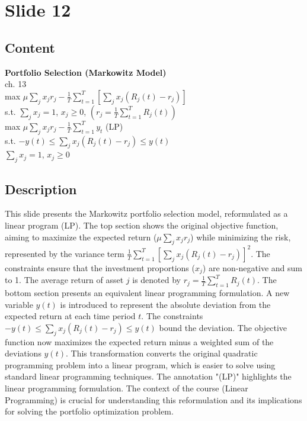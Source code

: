 \documentclass{article}%
\begin{document}
%
\newpage%
\section{Slide 12}%
\label{sec:Slide12}%
\subsection{Content}%

\textbf{Portfolio Selection (Markowitz Model)} \\
[v]ch. 13 \\
max $\mu \sum_j x_j r_j - \frac{1}{T} \sum_{t=1}^T \left[ \sum_j x_j (R_j(t) - r_j) \right]$ \\
s.t. $\sum_j x_j = 1$, $x_j \ge 0$, $\left( r_j = \frac{1}{T} \sum_{t=1}^T R_j(t) \right)$ \\
max $\mu \sum_j x_j r_j - \frac{1}{T} \sum_{t=1}^T y_t$ (LP) \\
s.t. $-y(t) \le \sum_j x_j (R_j(t) - r_j) \le y(t)$ \\
$\sum_j x_j = 1$, $x_j \ge 0$
%
\subsection{Description}%
This slide presents the Markowitz portfolio selection model, reformulated as a linear program (LP).  The top section shows the original objective function, aiming to maximize the expected return ($\mu \sum_j x_j r_j$) while minimizing the risk, represented by the variance term $\frac{1}{T} \sum_{t=1}^T [\sum_j x_j (R_j(t) - r_j)]^2$.  The constraints ensure that the investment proportions ($x_j$) are non-negative and sum to 1.  The average return of asset $j$ is denoted by $r_j = \frac{1}{T} \sum_{t=1}^T R_j(t)$. The bottom section presents an equivalent linear programming formulation.  A new variable $y(t)$ is introduced to represent the absolute deviation from the expected return at each time period $t$. The constraints $-y(t) \le \sum_j x_j (R_j(t) - r_j) \le y(t)$ bound the deviation. The objective function now maximizes the expected return minus a weighted sum of the deviations $y(t)$. This transformation converts the original quadratic programming problem into a linear program, which is easier to solve using standard linear programming techniques. The annotation "(LP)" highlights the linear programming formulation. The context of the course (Linear Programming) is crucial for understanding this reformulation and its implications for solving the portfolio optimization problem.%
\end{document}
